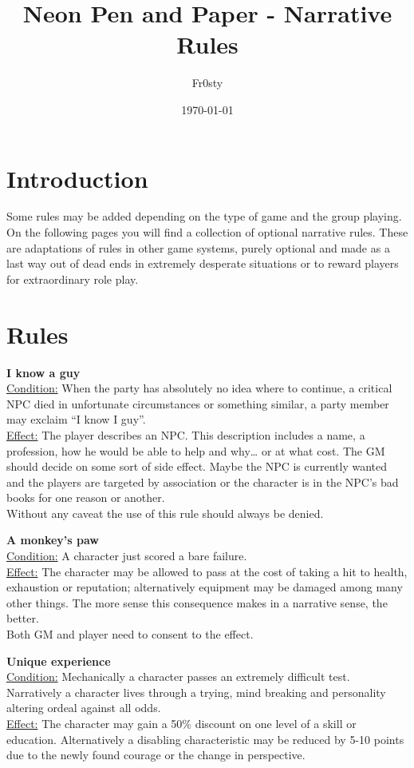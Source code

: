 \documentclass[12pt,a4paper,openany]{book}
\title{Neon Pen and Paper - Narrative Rules}
\author{Fr0sty}
\date{\today}
\newcommand{\nrule}[3]{
	\textbf{#1}\\
	\ul{Condition:} #2\\
	\ul{Effect:} #3\par
}
\begin{document}
	\maketitle

	\chapter{Introduction}
	Some rules may be added depending on the type of game and the group playing. On the following pages you will find a collection of optional narrative rules. These are adaptations of rules in other game systems, purely optional and made as a last way out of dead ends in extremely desperate situations or to reward players for extraordinary role play.
	
	\chapter{Rules}	
	\nrule{I know a guy}{When the party has absolutely no idea where to continue, a critical NPC died in unfortunate circumstances or something similar, a party member may exclaim “I know I guy”.}{The player describes an NPC. This description includes a name, a profession, how he would be able to help and why… or at what cost. The GM should decide on some sort of side effect. Maybe the NPC is currently wanted and the players are targeted by association or the character is in the NPC’s bad books for one reason or another.\\
		Without any caveat the use of this rule should always be denied.}
	\nrule{A monkey's paw}{A character just scored a bare failure.}{The character may be allowed to pass at the cost of taking a hit to health, exhaustion or reputation; alternatively equipment may be damaged among many other things. The more sense this consequence makes in a narrative sense, the better.\\
		Both GM and player need to consent to the effect.}
	\nrule{Unique experience}{Mechanically a character passes an extremely difficult test. Narratively a character lives through a trying, mind breaking and personality altering ordeal against all odds.}{The character may gain a 50\% discount on one level of a skill or education. Alternatively a disabling characteristic may be reduced by 5-10 points due to the newly found courage or the change in perspective.}
\end{document}
